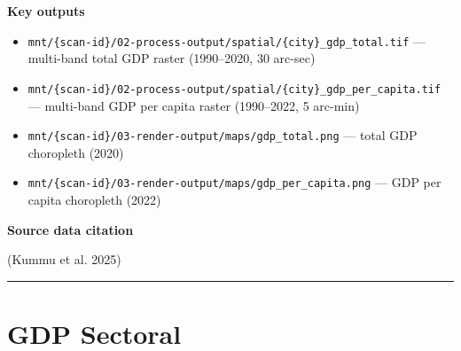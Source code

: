 \documentclass[
  letterpaper,
  DIV=11,
  numbers=noendperiod]{scrreprt}
\providecommand{\tightlist}{%
  \setlength{\itemsep}{0pt}\setlength{\parskip}{0pt}}
\begin{document}
\textbf{Key outputs}

\begin{itemize}
\tightlist
\item
  \texttt{mnt/\{scan-id\}/02-process-output/spatial/\{city\}\_gdp\_total.tif}
  --- multi-band total GDP raster (1990--2020, 30 arc-sec)
\item
  \texttt{mnt/\{scan-id\}/02-process-output/spatial/\{city\}\_gdp\_per\_capita.tif}
  --- multi-band GDP per capita raster (1990--2022, 5 arc-min)
\item
  \texttt{mnt/\{scan-id\}/03-render-output/maps/gdp\_total.png} ---
  total GDP choropleth (2020)
\item
  \texttt{mnt/\{scan-id\}/03-render-output/maps/gdp\_per\_capita.png}
  --- GDP per capita choropleth (2022)
\end{itemize}

\textbf{Source data citation}

(Kummu et al. 2025)

\begin{center}\rule{0.5\linewidth}{0.5pt}\end{center}

\section{GDP Sectoral}\label{gdp-sectoral}
\end{document}
